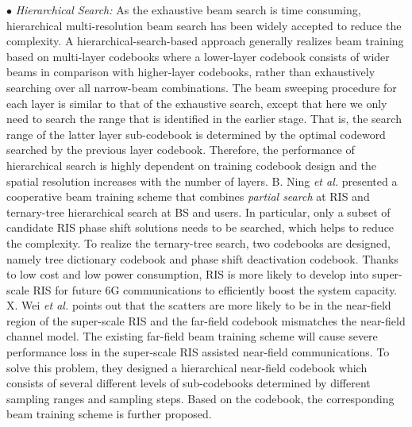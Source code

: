 \documentclass[journal,comsoc]{IEEEtran}
\begin{document}
$\bullet$ \emph{Hierarchical Search:} As the exhaustive beam search is time consuming, hierarchical multi-resolution beam search \cite{Terahertz-MIMO-RIS-2021,Beam-Training-Alignment-RIS-2022,Codebook-design-beam-training-RIS-2022} has been widely accepted to reduce the complexity. A hierarchical-search-based approach generally realizes beam training based on multi-layer codebooks where a lower-layer codebook consists of wider beams in comparison with higher-layer codebooks, rather than exhaustively searching over all narrow-beam combinations. The beam sweeping procedure for each layer is similar to that of the exhaustive search, except that here we only need to search the range that is identified in the earlier stage. That is, the search range of the latter layer sub-codebook is determined by the optimal codeword searched by the previous layer codebook. Therefore, the performance of hierarchical search is highly dependent on training codebook design and the spatial resolution increases with the number of layers. B. Ning \emph{et al.} \cite{Terahertz-MIMO-RIS-2021} presented a cooperative beam training scheme that combines \emph{partial search} at RIS and ternary-tree hierarchical search at BS and users. In particular, only a subset of candidate RIS phase shift solutions needs to be searched, which helps to reduce the complexity. To realize the ternary-tree search, two codebooks are designed, namely tree dictionary codebook and phase shift deactivation codebook. Thanks to low cost and low power consumption, RIS is more likely to develop into super-scale RIS for future 6G communications to efficiently boost the system capacity. X. Wei \emph{et al.} \cite{Codebook-design-beam-training-RIS-2022} points out that the scatters are more likely to be in the near-field region of the super-scale RIS and the far-field codebook \cite{Fast-Beam-Training-IRS-2020,Terahertz-MIMO-RIS-2021} mismatches the near-field channel model. The existing far-field beam training scheme will cause severe performance loss in the super-scale RIS assisted near-field communications. To solve this problem, they designed a hierarchical near-field codebook which consists of several different levels of sub-codebooks determined by different sampling ranges and sampling steps. Based on the codebook, the corresponding beam training scheme is further proposed.
\end{document}
